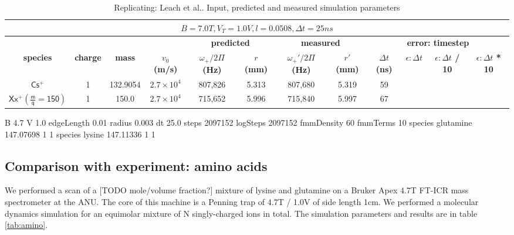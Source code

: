 \documentclass[10pt,conference,onecolumn]{IEEEtran}
\begin{document}
\begin{table}[htbp]
 \centering	  	  
 \caption{Replicating: Leach et al.\cite{Leach2009}. Input, predicted and measured simulation parameters}
\label{tab:leach}
\begin{tabular}{c|c|c|c|c|c|c|c|c|c|c|c}
 \hline \hline
  \multicolumn{12}{|c|}{$B = 7.0 T, V_T = 1.0 V, l = 0.0508, \Delta t = 25ns$} \\
 \hline \hline
 \multicolumn{4}{|c|}{ } & \multicolumn{2}{|c|}{\textbf{predicted}} & \multicolumn{2}{|c|}{\textbf{measured}} & \multicolumn{4}{|c|}{\textbf{error: timestep}} \\ 
 \hline
 \textbf{species} & \textbf{charge} & \textbf{mass} & \textbf{$v_0$ (m/s)} & \textbf{$\omega_+ / 2\Pi$ (Hz)} & \textbf{$r$ (mm)} & \textbf{$\omega_+' / 2\Pi$ (Hz)}  & \textbf{$r'$ (mm)} & \textbf{$\Delta t$ (ns)} & \textbf{$\epsilon: \Delta t$}& \textbf{$\epsilon: \Delta t$ / 10} & \textbf{$\epsilon: \Delta t$ * 10}\\ 
 \hline
 $\mathsf{Cs^+}$                   & 1 & 132.9054 & $2.7 \times 10^4$ & 807,826 & 5.313 & 807,680 & 5.319 & 59 & \\
 $\mathsf{Xx^+ (\frac{m}{q} = 150 )}$ & 1 & 150.0 & $2.7 \times 10^4$ & 715,652 & 5.996 & 715,840 & 5.997 & 67 & \\
 \hline \hline
\end{tabular}
\end{table}

B 4.7
V 1.0
edgeLength 0.01
radius 0.003
dt 25.0
steps 2097152
logSteps 2097152
fmmDensity 60
fmmTerms 10
species glutamine 147.07698 1 1
species lysine 147.11336 1 1

\subsection{Comparison with experiment: amino acids}
\label{sec:amino}

We performed a scan of a [TODO mole/volume fraction?] mixture of lysine and glutamine on a Bruker Apex 4.7T FT-ICR mass spectrometer at the ANU.
The core of this machine is a Penning trap of 4.7T / 1.0V of side length 1cm.
We performed a molecular dynamics simulation for an equimolar mixture of N singly-charged ions in total.
The simulation parameters and results are in table \ref{tab:amino}.
\end{document}

